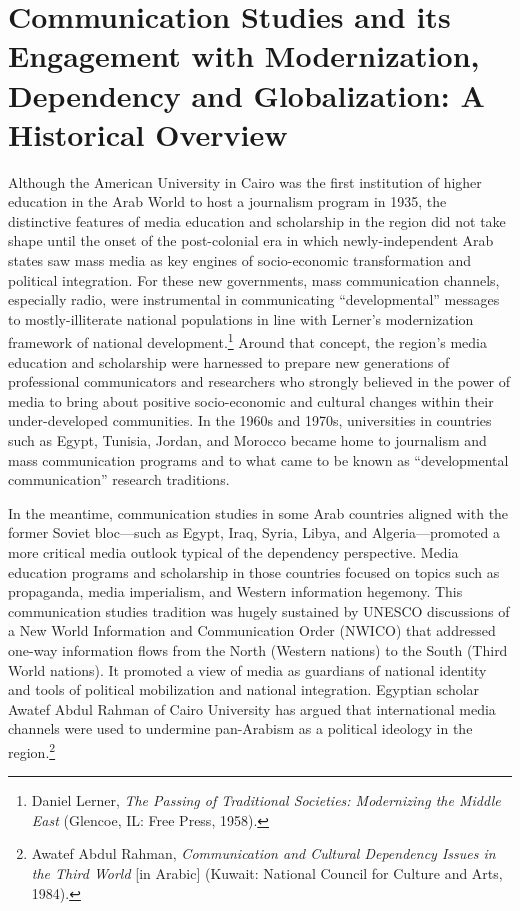 \documentclass{tufte-handout}
\begin{document}
\hypertarget{communication-studies-and-its-engagement-with-modernization-dependency-and-globalization-a-historical-overview}{%
\section{Communication Studies and its Engagement with Modernization,
Dependency and Globalization: A Historical
Overview}\label{communication-studies-and-its-engagement-with-modernization-dependency-and-globalization-a-historical-overview}}

Although the American University in Cairo was the first institution of
higher education in the Arab World to host a journalism program in 1935,
the distinctive features of media education and scholarship in the
region did not take shape until the onset of the post-colonial era in
which newly-independent Arab states saw mass media as key engines of
socio-economic transformation and political integration. For these new
governments, mass communication channels, especially radio, were
instrumental in communicating ``developmental'' messages to
mostly-illiterate national populations in line with Lerner's
modernization framework of national
development.\footnote{Daniel Lerner, \emph{The Passing of Traditional Societies: Modernizing
  the Middle East} (Glencoe, IL: Free Press, 1958).
} Around that concept,
the region's media education and scholarship were harnessed to prepare
new generations of professional communicators and researchers who
strongly believed in the power of media to bring about positive
socio-economic and cultural changes within their under-developed
communities. In the 1960s and 1970s, universities in countries such as
Egypt, Tunisia, Jordan, and Morocco became home to journalism and mass
communication programs and to what came to be known as ``developmental
communication'' research traditions.

In the meantime, communication studies in some Arab countries aligned
with the former Soviet bloc---such as Egypt, Iraq, Syria, Libya, and
Algeria---promoted a more critical media outlook typical of the
dependency perspective. Media education programs and scholarship in
those countries focused on topics such as propaganda, media imperialism,
and Western information hegemony. This communication studies tradition
was hugely sustained by UNESCO discussions of a New World Information
and Communication Order (NWICO) that addressed one-way information flows
from the North (Western nations) to the South (Third World nations). It
promoted a view of media as guardians of national identity and tools of
political mobilization and national integration. Egyptian scholar Awatef
Abdul Rahman of Cairo University has argued that international media
channels were used to undermine pan-Arabism as a political ideology in
the region.\footnote{Awatef Abdul Rahman, \emph{Communication and Cultural Dependency
  Issues in the Third World} {[}in Arabic{]} (Kuwait: National Council
  for Culture and Arts, 1984).
}
\end{document}
